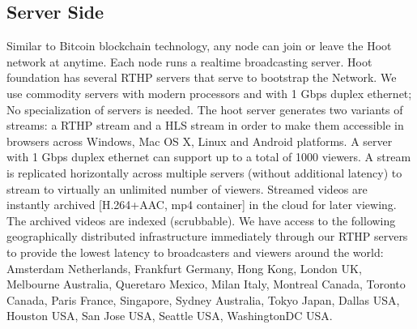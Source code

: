 \subsection{Server Side}
Similar to Bitcoin blockchain technology, any node can join or leave the Hoot network at anytime. Each node runs a realtime broadcasting server.
Hoot foundation has several RTHP servers that serve to bootstrap the Network. We use commodity servers with modern processors and with 1 Gbps duplex ethernet;
No specialization of servers is needed. The hoot server generates two variants of streams: a RTHP stream and a HLS stream in order to make them accessible in browsers across Windows, Mac OS X, Linux and Android platforms. A server with 1 Gbps duplex ethernet can support up to a total of 1000 viewers. A stream is replicated horizontally across multiple servers (without additional latency) to stream to virtually an unlimited number of viewers. 
Streamed videos are instantly archived [H.264+AAC, mp4 container] in the cloud for later viewing. The archived videos are indexed (scrubbable). We have access to the following geographically distributed infrastructure immediately through our RTHP servers to provide the lowest latency to broadcasters and viewers around the world: Amsterdam Netherlands, Frankfurt Germany, Hong Kong, London UK, Melbourne Australia, Queretaro Mexico, Milan Italy, Montreal Canada, Toronto Canada, Paris France, Singapore, Sydney Australia, Tokyo Japan, Dallas USA, Houston USA, San Jose USA, Seattle USA, WashingtonDC USA.

